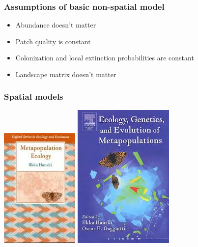 \documentclass[color=usenames,dvipsnames]{beamer}\usepackage[]{graphicx}\usepackage[]{color}
\begin{document}
\begin{frame}
  \frametitle{Assumptions of basic non-spatial model}
  \Large
  \begin{itemize}
    \item Abundance doesn't matter
    \item Patch quality is constant
    \item Colonization and local extinction probabilities are constant
    \item Landscape matrix doesn't matter %
  \end{itemize}
\end{frame}






\begin{frame}
  \frametitle{Spatial models}
  \begin{center}
    \includegraphics[height=0.7\textheight,keepaspectratio]{figs/metapop-e}
    \hspace{0.3cm}
    \includegraphics[height=0.7\textheight,keepaspectratio]{figs/metapop-ee}
  \end{center}
\end{frame}
\end{document}
